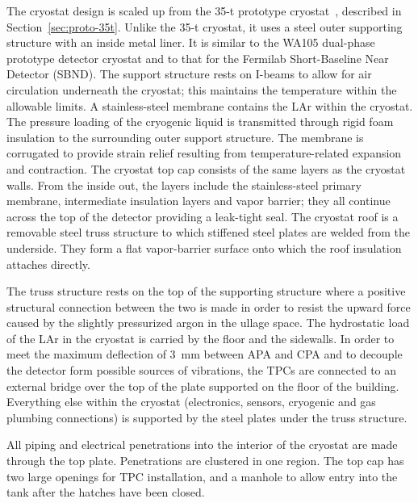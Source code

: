 The cryostat design is scaled up from the 35-t prototype
cryostat~\cite{montanari_35ton}, described in
Section~\ref{sec:proto-35t}.  Unlike the 35-t cryostat, it uses a
steel outer supporting structure with an inside metal liner.
It is similar to the WA105 dual-phase prototype detector cryostat and to that for the Fermilab Short-Baseline Near Detector (SBND). 
The support structure rests on I-beams to allow for air circulation
underneath the cryostat; this maintains the temperature within the
allowable limits.  A stainless-steel membrane contains the LAr within
the cryostat. The pressure loading of the cryogenic liquid is
transmitted through rigid foam insulation to the surrounding outer
support structure. The membrane is corrugated to provide strain relief
resulting from temperature-related expansion and contraction. The
cryostat top cap consists of the same layers as the cryostat walls.
%
From the inside out, the layers include the stainless-steel primary
membrane, intermediate insulation layers and vapor barrier; they all
continue across the top of the detector providing a
leak-tight seal.  The cryostat roof is a removable steel truss
structure to which stiffened steel plates are welded from the
underside. They form a flat vapor-barrier surface onto which the roof
insulation attaches directly.


The truss structure rests on the top of the supporting structure where
a positive structural connection between the two is made in order to
resist the upward force caused by the slightly pressurized argon in
the ullage space. The hydrostatic load of the LAr in the cryostat is
carried by the floor and the sidewalls. In order to meet the maximum
deflection of 3~mm between APA and CPA and to decouple the detector
form possible sources of vibrations, the TPCs are connected to an
external bridge over the top of the plate supported on the floor of
the building. Everything else within the cryostat (electronics,
sensors, cryogenic and gas plumbing connections) is supported by the
steel plates under the truss structure.

All piping and electrical penetrations into the interior of the
cryostat are made through the top plate.  Penetrations are clustered
in one region.  The top cap has two large openings for TPC
installation, and a manhole to allow entry into the tank after the
hatches have been closed.

